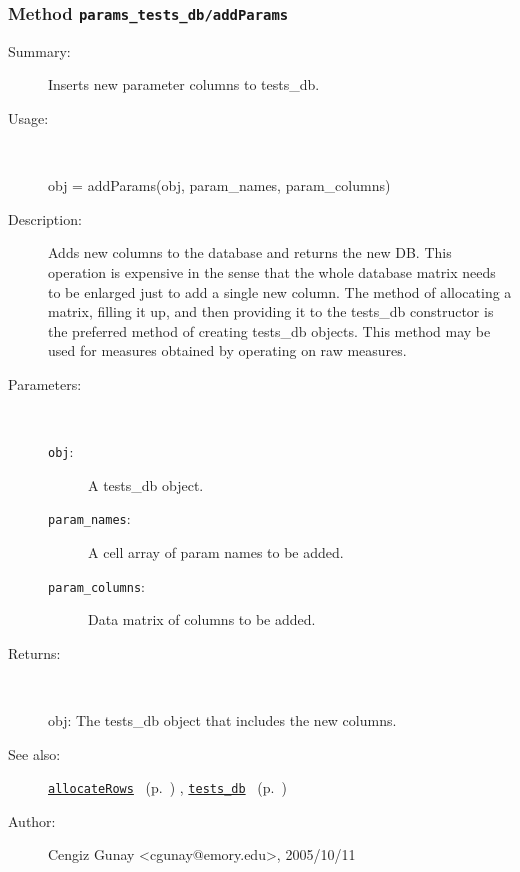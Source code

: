 \subsubsection[Method \texttt{addParams}]{Method \texttt{params\_tests\_db/addParams}}%
%
\label{ref_params_tests_db__addParams}%
\hypertarget{ref_params_tests_db__addParams}{}%
\begin{description}
\item[Summary:]Inserts new parameter columns to tests\_db.
%
\item[Usage:]~%
\begin{lyxcode}%
obj = addParams(obj, param\_names, param\_columns)
%
\end{lyxcode}%
%
\item[Description:]%
Adds new columns to the database and returns the new DB.
   This operation is expensive in the sense that the whole database matrix
   needs to be enlarged just to add a 
   single new column. The method of allocating a matrix, filling it up, and
   then providing it to the tests\_db constructor is the preferred method 
   of creating tests\_db objects. This method may be used for 
   measures obtained by operating on raw measures.
\item[Parameters:]~
\begin{description}%
\item[\texttt{obj}:]
 A tests\_db object.
\item[\texttt{param\_names}:]
 A cell array of param names to be added.
\item[\texttt{param\_columns}:]
 Data matrix of columns to be added.
\end{description}%
%
\item[Returns:]~

	obj: The tests\_db object that includes the new columns.
%
%
\item[See also:]%
\hyperlink{ref_allocateRows}{\texttt{allocateRows}}%
\ (p.~\pageref{ref_allocateRows})%
%
, \hyperlink{ref_tests_db}{\texttt{tests\_db}}%
\ (p.~\pageref{ref_tests_db})%
%
%
\item[Author:]%
Cengiz Gunay <cgunay@emory.edu>, 2005/10/11%
\end{description}
\methodline%
